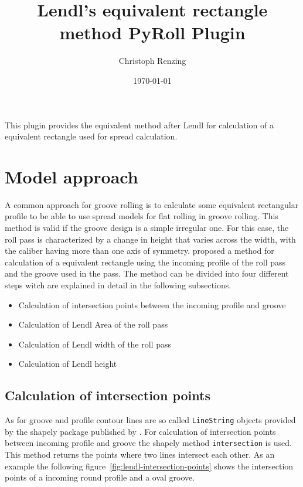 \documentclass[11pt]{PyRollDocs}
\begin{document}
    \title{Lendl's equivalent rectangle method PyRoll Plugin}
    \author{Christoph Renzing}
    \date{\today}

    \maketitle

    This plugin provides the equivalent method after Lendl for calculation of a equivalent rectangle used for spread calculation.


    \section{Model approach}\label{sec:model-approach}

    A common approach for groove rolling is to calculate some equivalent rectangular profile to be able to use spread models for flat rolling in groove rolling.
    This method is valid if the groove design is a simple irregular one.
    For this case, the roll pass is characterized by a change in height that varies across the width, with the caliber having more than one axis of symmetry.
    \textcite{Lendl_1948a, Lendl_1948b, Lendl_1949} proposed a method for calculation of a equivalent rectangle using the incoming profile of the roll pass and the groove used in the pass.
    The method can be divided into four different steps witch are explained in detail in the following subsections.

    \begin{itemize}
        \item Calculation of intersection points between the incoming profile and groove
        \item Calculation of Lendl Area of the roll pass
        \item Calculation of Lendl width of the roll pass
        \item Calculation of Lendl height
    \end{itemize}

    \subsection{Calculation of intersection points}\label{subsec:intersection-points}
    As for groove and profile contour lines are so called \texttt{LineString} objects provided by the shapely package published by \textcite{shapely2007}.
    For calculation of intersection points between incoming profile and groove the shapely method \texttt{intersection} is used.
    This method returns the points where two lines intersect each other.
    As an example the following figure~\ref{fig:lendl-intersection-points} shows the intersection points of a incoming round profile and a oval groove.
\end{document}

